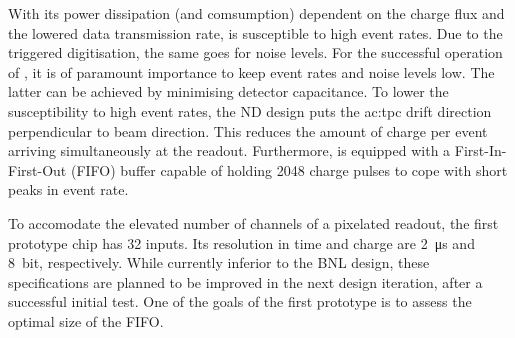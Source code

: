 With its power dissipation (and comsumption) dependent on the charge flux and the lowered data transmission rate, \larpix{} is susceptible to high event rates.
Due to the triggered digitisation, the same goes for noise levels.
For the successful operation of \larpix{}, it is of paramount importance to keep event rates and noise levels low.
The latter can be achieved by minimising detector capacitance.
To lower the susceptibility to high event rates, the \dune{} ND design puts the \gls{ac:tpc} drift direction perpendicular to beam direction.
This reduces the amount of charge per event arriving simultaneously at the readout.
Furthermore, \larpix{} is equipped with a First-In-First-Out (FIFO) buffer capable of holding \num{2048} charge pulses to cope with short peaks in event rate.

To accomodate the elevated number of channels of a pixelated readout, the first \larpix{} prototype chip has \num{32} inputs.
Its resolution in time and charge are \SI{2}{\micro\second} and \SI{8}{bit}, respectively.
While currently inferior to the BNL design, these specifications are planned to be improved in the next design iteration, after a successful initial test.
One of the goals of the first prototype is to assess the optimal size of the FIFO.~\cite{danLarpix}

\afterpage{\clearpage}